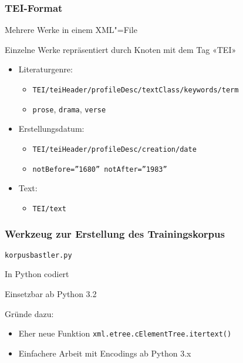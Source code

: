 \documentclass[t]{beamer} %
\begin{document}
\begin{frame}
  \frametitle{TEI-Format}
  Mehrere Werke in einem XML"=File
  \vspace*{1ex}
  
  Einzelne Werke repräsentiert durch Knoten mit dem Tag «TEI»
  \begin{itemize}
  \item Literaturgenre:
    \begin{itemize}
    \item \texttt{TEI/teiHeader/profileDesc/textClass/keywords/term}    
    \item \texttt{prose}, \texttt{drama}, \texttt{verse}
    \end{itemize}
    \vspace*{1ex}
    \pause
    
  \item Erstellungsdatum: 
    \begin{itemize}
    \item \texttt{TEI/teiHeader/profileDesc/creation/date}   
    \item \texttt{notBefore=''1680'' notAfter=''1983''}
    \end{itemize}
    \vspace*{1ex}
    \pause
    
  \item Text:\\
    \begin{itemize}
    \item \texttt{TEI/text}
    \end{itemize}
  \end{itemize}
\end{frame}

\begin{frame}
  \frametitle{Werkzeug zur Erstellung des Trainingskorpus}
  \texttt{korpusbastler.py}
  \vspace*{1ex}
  
  In Python codiert
  \vspace*{1ex}
  
  Einsetzbar ab Python 3.2
  
  Gründe dazu:
  \begin{itemize}
  \item Eher neue Funktion \texttt{xml.etree.cElementTree.itertext()}
  \item Einfachere Arbeit mit Encodings ab Python 3.x
  \end{itemize}
\end{frame}
\end{document}

